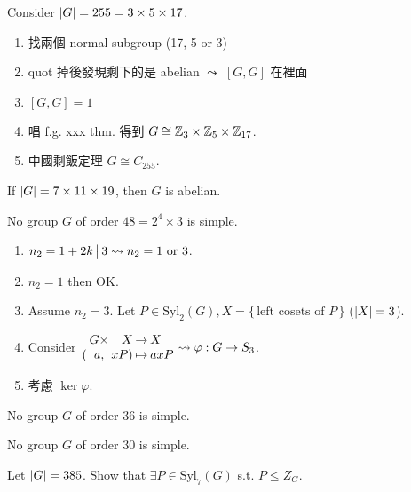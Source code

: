 \begin{example}
  Consider $\lvert G\rvert = 255 = 3 \times 5 \times 17$.
  \begin{enumerate}
    \item 找兩個 normal subgroup (17, 5 or 3)
    \item quot 掉後發現剩下的是 abelian $\leadsto$ $[G, G]$ 在裡面
    \item $[G, G] = 1$
    \item 唱 f.g. xxx thm. 得到 $G \cong \mathbb{Z}_3 \times \mathbb{Z}_5 \times \mathbb{Z}_{17}$.
    \item 中國剩飯定理 $G \cong C_{255}$.
  \end{enumerate}
\end{example}

\begin{exercise}
  If $\lvert G\rvert = 7 \times 11 \times 19$, then $G$ is abelian.
\end{exercise}

\begin{example}
  No group $G$ of order $48 = 2^4 \times 3$ is simple.
  \begin{enumerate}
    \item $n_2 = 1 + 2k \,\big|\, 3 \leadsto n_2 = 1 \text{~or~} 3$.
    \item $n_2 = 1$ then OK.
    \item Assume $n_2 = 3$. Let $P \in \text{Syl}_2(G),
      X = \{\, \text{left cosets of $P$} \,\}$ ($\lvert X\rvert = 3$).
    \item Consider $\arraycolsep=1pt \begin{array}{ccrcl}
        &G \times &X & \to & X \\
        (&a, &xP) & \mapsto & axP
      \end{array} \leadsto \varphi: G \to S_3$.
    \item 考慮 $\ker\varphi$.
  \end{enumerate}
\end{example}

\begin{exercise}
  No group $G$ of order $36$ is simple.
\end{exercise}

\begin{exercise}
  No group $G$ of order $30$ is simple.
\end{exercise}

\begin{exercise}
  Let $\lvert G\rvert = 385$. Show that $\exists P \in \text{Syl}_7(G)$ s.t.
  $P \le Z_G$.
\end{exercise}
